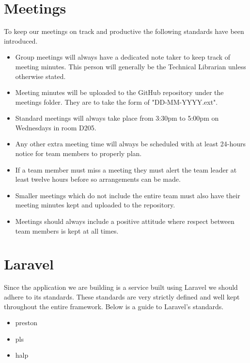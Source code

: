 \documentclass[]{article}
\begin{document}
\section{Meetings}
To keep our meetings on track and productive the following standards have been introduced.
\begin{itemize}
	\item Group meetings will always have a dedicated note taker to keep track of meeting minutes. This person will generally be the Technical Librarian unless otherwise stated.
	\item Meeting minutes will be uploaded to the GitHub repository under the meetings folder. They are to take the form of "DD-MM-YYYY.ext".
	\item Standard meetings will always take place from 3:30pm to 5:00pm on Wednesdays in room D205.
	\item Any other extra meeting time will always be scheduled with at least 24-hours notice for team members to properly plan.
	\item If a team member must miss a meeting they must alert the team leader at least twelve hours before so arrangements can be made.
	\item Smaller meetings which do not include the entire team must also have their meeting minutes kept and uploaded to the repository.
	\item Meetings should always include a positive attitude where respect between team members is kept at all times.
\end{itemize}

\section{Laravel}
Since the application we are building is a service built using Laravel we should adhere to its standards. These standards are very strictly defined and well kept throughout the entire framework. Below is a guide to Laravel's standards.
\begin{itemize}
	\item preston
	\item pls
	\item halp
\end{itemize}
\end{document}
